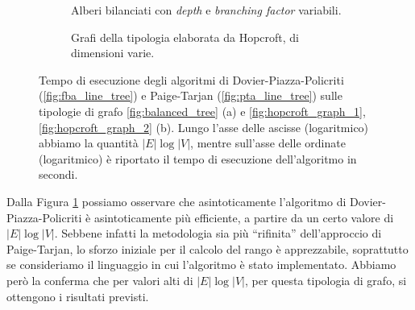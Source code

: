 \begin{figure}[b!]
    \begin{subfigure}[t]{0.5\textwidth}
        \caption{Alberi bilanciati con \emph{depth} e \emph{branching factor} variabili.}
        \label{fig:tree_exp_result}
    \end{subfigure}
    \begin{subfigure}[t]{0.5\textwidth}
        \caption{Grafi della tipologia elaborata da Hopcroft, di dimensioni varie.}
        \label{fig:hopcroft_exp_result}
    \end{subfigure}
    \caption{Tempo di esecuzione degli algoritmi di Dovier-Piazza-Policriti (\ref*{fig:fba_line_tree}) e Paige-Tarjan (\ref*{fig:pta_line_tree}) sulle tipologie di grafo \ref{fig:balanced_tree} (a) e \ref{fig:hopcroft_graph_1}, \ref{fig:hopcroft_graph_2} (b). Lungo l'asse delle ascisse (logaritmico) abbiamo la quantità $|E|\log|V|$, mentre sull'asse delle ordinate (logaritmico) è riportato il tempo di esecuzione dell'algoritmo in secondi.}
\end{figure}

Dalla Figura \ref{fig:tree_exp_result} possiamo osservare che asintoticamente l'algoritmo di Dovier-Piazza-Policriti è asintoticamente più efficiente, a partire da un certo valore di $|E| \log |V|$. Sebbene infatti la metodologia sia più ``rifinita'' dell'approccio di Paige-Tarjan, lo sforzo iniziale per il calcolo del rango è apprezzabile, soprattutto se consideriamo il linguaggio in cui l'algoritmo è stato implementato. Abbiamo però la conferma che per valori alti di $|E| \log |V|$, per questa tipologia di grafo, si ottengono i risultati previsti.

